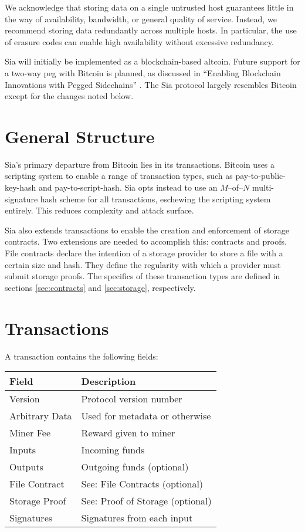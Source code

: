 \documentclass[twocolumn]{article}
\begin{document}
We acknowledge that storing data on a single untrusted host guarantees little in the way of availability, bandwidth, or general quality of service.
Instead, we recommend storing data redundantly across multiple hosts.
In particular, the use of erasure codes can enable high availability without excessive redundancy.

Sia will initially be implemented as a blockchain-based altcoin.
Future support for a two-way peg with Bitcoin is planned, as discussed in ``Enabling Blockchain Innovations with Pegged Sidechains'' \cite{side}.
The Sia protocol largely resembles Bitcoin except for the changes noted below.

\section{General Structure}
Sia's primary departure from Bitcoin lies in its transactions.
Bitcoin uses a scripting system to enable a range of transaction types, such as pay-to-public-key-hash and pay-to-script-hash.
Sia opts instead to use an $M$--of--$N$ multi-signature hash scheme for all transactions, eschewing the scripting system entirely.
This reduces complexity and attack surface.

Sia also extends transactions to enable the creation and enforcement of storage contracts.
Two extensions are needed to accomplish this: contracts and proofs.
File contracts declare the intention of a storage provider to store a file with a certain size and hash.
They define the regularity with which a provider must submit storage proofs.
The specifics of these transaction types are defined in sections \ref{sec:contracts} and \ref{sec:storage}, respectively.

\section{Transactions}
A transaction contains the following fields: \\
\begin{tabular}{| l | l |}
	\hline
	\textbf{Field} & \textbf{Description} \\ \hline
	Version        & Protocol version number \\ \hline
	Arbitrary Data & Used for metadata or otherwise \\ \hline
	Miner Fee      & Reward given to miner \\ \hline
	Inputs         & Incoming funds \\ \hline
	Outputs        & Outgoing funds (optional) \\ \hline
	File Contract  & See: File Contracts (optional) \\ \hline
	Storage Proof  & See: Proof of Storage (optional) \\ \hline
	Signatures     & Signatures from each input \\ \hline
\end{tabular}
\end{document}
